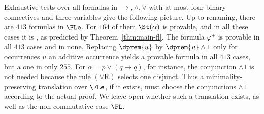 Exhaustive tests over all formulas in $\to,\wedge,\vee$ with at most four
binary connectives and three variables give the following picture. Up to
renaming, there are $413$ formulas  in $\FLe$. For $164$ of
them $\St(\alpha)$ is provable, and in all these cases it is , as
predicted by Theorem~\ref{thm:main-fl}. The formula $\varphi^+$ is provable in
all $413$ cases and  in none. Replacing $\dprem{u}$ by $\dprem{u}\wedge1$ only for
occurrences $u$  an additive occurrence yields a provable formula
in all $413$ cases, but a  one in only $255$. For
$\alpha=p\vee(q\to q)$, for instance, the conjunction $\wedge1$ is not needed because
the rule $({\vee}\mathrm{R})$ selects one disjunct. Thus a
minimality-preserving translation over $\FLe$, if it exists, must
choose the conjunctions $\wedge1$ according to the actual proof. We leave open whether such a
translation exists, as well as the non-commutative case $\FL$.
